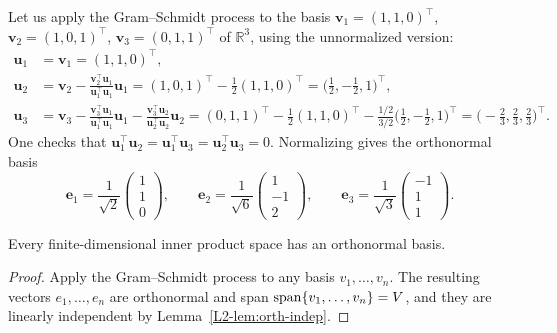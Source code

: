 \begin{example}\label{L2-ex:gram-schmidt}
    Let us apply the Gram--Schmidt process to the basis $\mathbf{v}_1 = (1, 1, 0)^\top$, $\mathbf{v}_2 = (1, 0, 1)^\top$, $\mathbf{v}_3 = (0, 1, 1)^\top$ of $\mathbb{R}^3$, using the unnormalized version:
    \begin{align*}
        \mathbf{u}_1 &= \mathbf{v}_1 = (1, 1, 0)^\top, \\
        \mathbf{u}_2 &= \mathbf{v}_2 - \frac{\mathbf{v}_2^\top \mathbf{u}_1}{\mathbf{u}_1^\top \mathbf{u}_1} \mathbf{u}_1 = (1, 0, 1)^\top - \frac{1}{2}(1, 1, 0)^\top = \big(\tfrac{1}{2}, -\tfrac{1}{2}, 1\big)^\top, \\
        \mathbf{u}_3 &= \mathbf{v}_3 - \frac{\mathbf{v}_3^\top \mathbf{u}_1}{\mathbf{u}_1^\top \mathbf{u}_1} \mathbf{u}_1 - \frac{\mathbf{v}_3^\top \mathbf{u}_2}{\mathbf{u}_2^\top \mathbf{u}_2} \mathbf{u}_2 = (0, 1, 1)^\top - \frac{1}{2}(1, 1, 0)^\top - \frac{1/2}{3/2}\big(\tfrac{1}{2}, -\tfrac{1}{2}, 1\big)^\top = \big(-\tfrac{2}{3}, \tfrac{2}{3}, \tfrac{2}{3}\big)^\top.
    \end{align*}
    One checks that $\mathbf{u}_1^\top \mathbf{u}_2 = \mathbf{u}_1^\top \mathbf{u}_3 = \mathbf{u}_2^\top \mathbf{u}_3 = 0$. Normalizing gives the orthonormal basis
    \[\mathbf{e}_1 = \frac{1}{\sqrt{2}} \begin{pmatrix} 1 \\ 1 \\ 0 \end{pmatrix}, \qquad \mathbf{e}_2 = \frac{1}{\sqrt{6}} \begin{pmatrix} 1 \\ -1 \\ 2 \end{pmatrix}, \qquad \mathbf{e}_3 = \frac{1}{\sqrt{3}} \begin{pmatrix} -1 \\ 1 \\ 1 \end{pmatrix}.\]
\end{example}

\begin{corollary}\label{L2-cor:onb-exists}
    Every finite-dimensional inner product space has an orthonormal basis.
\end{corollary}

\begin{proof}
    Apply the Gram--Schmidt process to any basis $v_1, \ldots, v_n$. The resulting vectors $e_1, \ldots, e_n$ are orthonormal and span $\operatorname{span}\{v_1, \ldots, v_n\} = V$, and they are linearly independent by Lemma~\ref{L2-lem:orth-indep}.
\end{proof}

